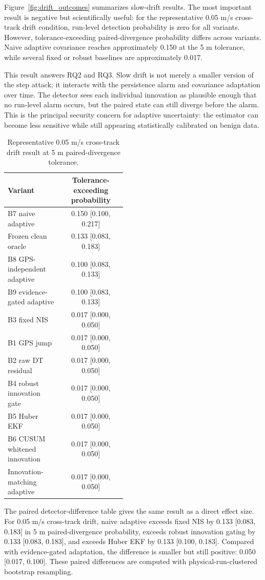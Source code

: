 \documentclass[conference]{IEEEtran}
\begin{document}
Figure~\ref{fig:drift_outcomes} summarizes slow-drift results. The most
important result is negative but scientifically useful: for the representative
0.05 m/s cross-track drift condition, run-level detection probability is zero
for all variants. However, tolerance-exceeding paired-divergence probability differs across
variants. Naive adaptive covariance reaches approximately 0.150 at the 5 m tolerance, while several
fixed or robust baselines are approximately 0.017.

This result answers RQ2 and RQ3. Slow drift is not merely a smaller version of
the step attack; it interacts with the persistence alarm and covariance
adaptation over time. The detector sees each individual innovation as
plausible enough that no run-level alarm occurs, but the paired state can
still diverge before the alarm. This is the principal security concern for
adaptive uncertainty: the estimator can become less sensitive while still
appearing statistically calibrated on benign data.

\begin{table}[t]
\centering
\caption{Representative 0.05 m/s cross-track drift result at 5 m paired-divergence tolerance.}
\label{tab:drift_5m_tolerance}
\scriptsize
\begin{tabular}{L{0.46\linewidth} c}
\toprule
\textbf{Variant} & \textbf{Tolerance-exceeding probability} \\
\midrule
B7 naive adaptive & 0.150 [0.100, 0.217] \\
Frozen clean oracle & 0.133 [0.083, 0.183] \\
B8 GPS-independent adaptive & 0.100 [0.083, 0.133] \\
B9 evidence-gated adaptive & 0.100 [0.083, 0.133] \\
B3 fixed NIS & 0.017 [0.000, 0.050] \\
B1 GPS jump & 0.017 [0.000, 0.050] \\
B2 raw DT residual & 0.017 [0.000, 0.050] \\
B4 robust innovation gate & 0.017 [0.000, 0.050] \\
B5 Huber EKF & 0.017 [0.000, 0.050] \\
B6 CUSUM whitened innovation & 0.017 [0.000, 0.050] \\
Innovation-matching adaptive & 0.017 [0.000, 0.050] \\
\bottomrule
\end{tabular}
\end{table}

The paired detector-difference table gives the same result as a direct effect
size. For 0.05 m/s cross-track drift, naive adaptive exceeds fixed NIS by
0.133 [0.083, 0.183] in 5 m paired-divergence probability, exceeds robust
innovation gating by 0.133 [0.083, 0.183], and exceeds Huber EKF by 0.133
[0.100, 0.183]. Compared with evidence-gated adaptation, the difference is
smaller but still positive: 0.050 [0.017, 0.100]. These paired differences are
computed with physical-run-clustered bootstrap resampling.
\end{document}
